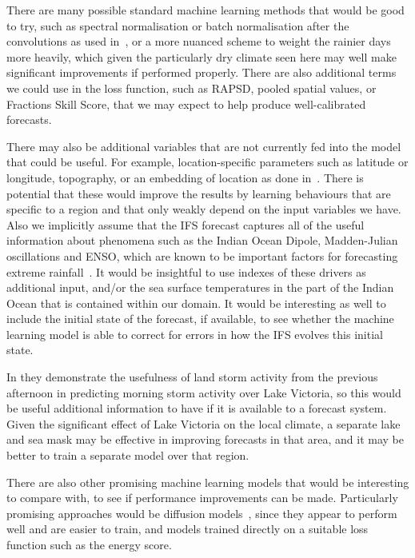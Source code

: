 \documentclass[../main.tex]{subfiles}
\begin{document}
There are many possible standard machine learning methods that would be good to try, such as spectral normalisation or batch normalisation after the convolutions as used in~\cite{ravuri_skilful_2021}, or a more nuanced scheme to weight the rainier days more heavily, which given the particularly dry climate seen here may well make significant improvements if performed properly. There are also additional terms we could use in the loss function, such as RAPSD, pooled spatial values, or Fractions Skill Score, that we may expect to help produce well-calibrated forecasts. 

There may also be additional variables that are not currently fed into the model that could be useful. For example, location-specific parameters such as latitude or longitude, topography, or an embedding of location as done in~\cite{rasp_neural_2018}. There is potential that these would improve the results by learning behaviours that are specific to a region and that only weakly depend on the input variables we have. Also we implicitly assume that the IFS forecast captures all of the useful information about phenomena such as the Indian Ocean Dipole, Madden-Julian oscillations and ENSO, which are known to be important factors for forecasting extreme rainfall~\citep{wainwright_extreme_2021, palmer_drivers_2023}. It would be insightful to use indexes of these drivers as additional input, and/or the sea surface temperatures in the part of the Indian Ocean that is contained within our domain. It would be interesting as well to include the initial state of the forecast, if available, to see whether the machine learning model is able to correct for errors in how the IFS evolves this initial state.


In \cite{thiery_early_2017} they demonstrate the usefulness of land storm activity from the previous afternoon in predicting morning storm activity over Lake Victoria, so this would be useful additional information to have if it is available to a forecast system. Given the significant effect of Lake Victoria on the local climate, a separate lake and sea mask may be effective in improving forecasts in that area, and it may be better to train a separate model over that region.

There are also other promising machine learning models that would be interesting to compare with, to see if performance improvements can be made. Particularly promising approaches would be diffusion models~\citep{addison_machine_2022}, since they appear to perform well and are easier to train, and models trained directly on a suitable loss function such as the energy score.






\ifSubfilesClassLoaded{%
    
    

}{}
\end{document}

